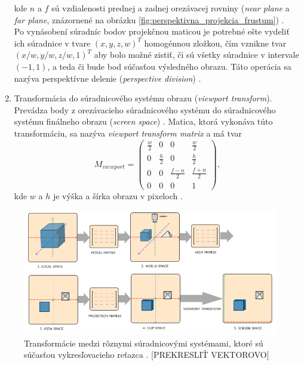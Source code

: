 \begin{enumerate}
$$    $$
    kde $n$ a $f$ sú vzdialenosti prednej a zadnej orezávacej rovniny (\emph{near plane} a \emph{far plane}, znázornené na obrázku \ref{fig:perspektivna_projekcia_frustum}) \cite{ahn_projection_matrix}. \\ 
    Po vynásobení súradníc bodov projekčnou maticou je potrebné ešte vydeliť ich súradnice v tvare $(x, y, z, w)^T$ homogénnou zložkou, čím vznikne tvar $(x/w, y/w, z/w, 1)^T$ aby bolo možné zistiť, či sú všetky súradnice v intervale $(-1, 1)$, a teda či bude bod súčasťou výsledného obrazu. Táto operácia sa nazýva perspektívne delenie (\emph{perspective division}) \cite{de_vries_coordinate_systems}.  
    \item Transformácia do súradnicového systému obrazu (\emph{viewport transform}). Prevádza body z orezávacieho súradnicového systému do súradnicového systému finálneho obrazu (\emph{\mbox{screen} space}) \cite{de_vries_coordinate_systems}. Matica, ktorá vykonáva túto transformáciu, sa nazýva \emph{viewport transform matrix} a má tvar
    $$
    M_{viewport} = 
    \begin{pmatrix}
    \frac{w}{2} & 0 & 0 & \frac{w}{2} \\
    0 & \frac{h}{2} & 0 & \frac{h}{2} \\
    0 & 0 & \frac{f-n}{2} & \frac{f+n}{2} \\
    0 & 0 & 0 & 1
    \end{pmatrix}
    \mathrm{,}
    $$
    kde $w$ a $h$ je výška a šírka obrazu v pixeloch \cite{ahn_viewport_transform}.
\end{enumerate}

\begin{figure}[h]
    \centering
    \includegraphics[width=1\linewidth]{text_prace/obrazky-figures/suradnicove_systemy.png}
    \caption{Transformácie medzi rôznymi súradnicovými systémami, ktoré sú súčasťou vykresľovacieho reťazca \cite{de_vries_coordinate_systems}. [PREKRESLIŤ VEKTOROVO]}
    \label{fig:suradnicove_systemy}
\end{figure}


